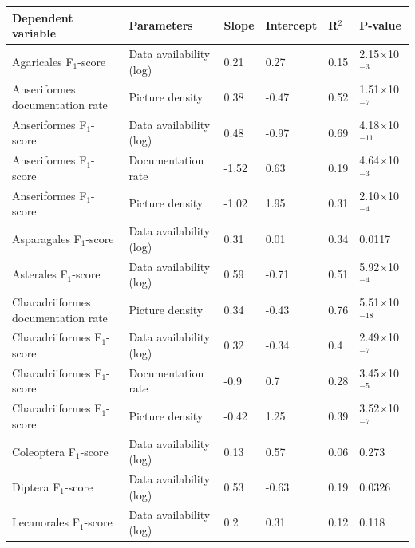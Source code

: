\documentclass{article}
\begin{document}
\begin{longtable}{|p{} | p{} | p{} | p{} | p{} | p{} |}
  \hline
  \textbf{Dependent variable}        &
  \textbf{Parameters}                &
  \textbf{Slope}                     &
  \textbf{Intercept}                 &
  \textbf{R$^2$}                     &
  \textbf{P-value}                                                                                      \\ [0.5ex]
  \hline

  Agaricales F$_1$-score             & Data availability (log) & 0.21  & 0.27  & 0.15 & 2.15×10$^{-3}$  \\ \hline
  Anseriformes documentation rate    & Picture density         & 0.38  & -0.47 & 0.52 & 1.51×10$^{-7}$  \\ \hline
  Anseriformes F$_1$-score           & Data availability (log) & 0.48  & -0.97 & 0.69 & 4.18×10$^{-11}$ \\ \hline
  Anseriformes F$_1$-score           & Documentation rate      & -1.52 & 0.63  & 0.19 & 4.64×10$^{-3}$  \\ \hline
  Anseriformes F$_1$-score           & Picture density         & -1.02 & 1.95  & 0.31 & 2.10×10$^{-4}$  \\ \hline
  Asparagales F$_1$-score            & Data availability (log) & 0.31  & 0.01  & 0.34 & 0.0117          \\ \hline
  Asterales F$_1$-score              & Data availability (log) & 0.59  & -0.71 & 0.51 & 5.92×10$^{-4}$  \\ \hline
  Charadriiformes documentation rate & Picture density         & 0.34  & -0.43 & 0.76 & 5.51×10$^{-18}$ \\ \hline
  Charadriiformes F$_1$-score        & Data availability (log) & 0.32  & -0.34 & 0.4  & 2.49×10$^{-7}$  \\ \hline
  Charadriiformes F$_1$-score        & Documentation rate      & -0.9  & 0.7   & 0.28 & 3.45×10$^{-5}$  \\ \hline
  Charadriiformes F$_1$-score        & Picture density         & -0.42 & 1.25  & 0.39 & 3.52×10$^{-7}$  \\ \hline
  Coleoptera F$_1$-score             & Data availability (log) & 0.13  & 0.57  & 0.06 & 0.273           \\ \hline
  Diptera F$_1$-score                & Data availability (log) & 0.53  & -0.63 & 0.19 & 0.0326          \\ \hline
  Lecanorales F$_1$-score            & Data availability (log) & 0.2   & 0.31  & 0.12 & 0.118           \\ \hline

\end{longtable}
\end{document}
